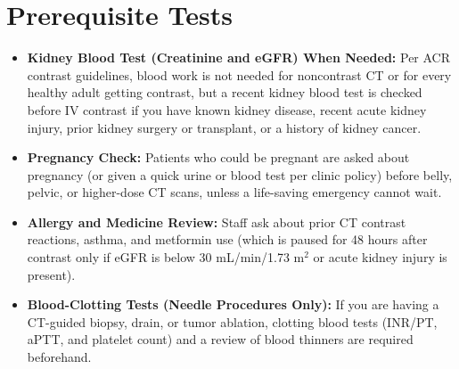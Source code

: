 \section{Prerequisite Tests}
\begin{itemize}
    \item \textbf{Kidney Blood Test (Creatinine and eGFR) When Needed:} Per ACR contrast guidelines, blood work is not needed for noncontrast CT or for every healthy adult getting contrast, but a recent kidney blood test is checked before IV contrast if you have known kidney disease, recent acute kidney injury, prior kidney surgery or transplant, or a history of kidney cancer.
    \item \textbf{Pregnancy Check:} Patients who could be pregnant are asked about pregnancy (or given a quick urine or blood test per clinic policy) before belly, pelvic, or higher-dose CT scans, unless a life-saving emergency cannot wait.
    \item \textbf{Allergy and Medicine Review:} Staff ask about prior CT contrast reactions, asthma, and metformin use (which is paused for 48 hours after contrast only if eGFR is below 30 mL/min/1.73 m$^2$ or acute kidney injury is present).
    \item \textbf{Blood-Clotting Tests (Needle Procedures Only):} If you are having a CT-guided biopsy, drain, or tumor ablation, clotting blood tests (INR/PT, aPTT, and platelet count) and a review of blood thinners are required beforehand.
\end{itemize}

